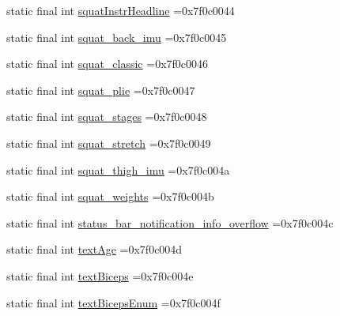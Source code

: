 \begin{DoxyCompactItemize}
\item 
static final int \mbox{\hyperlink{classcom_1_1example_1_1trainawearapplication_1_1_r_1_1string_a59bf3289f3762d505af6917df0dc34f4}{squat\+Instr\+Headline}} =0x7f0c0044
\item 
static final int \mbox{\hyperlink{classcom_1_1example_1_1trainawearapplication_1_1_r_1_1string_a8c166196f61da152cb46e01eda884180}{squat\+\_\+back\+\_\+imu}} =0x7f0c0045
\item 
static final int \mbox{\hyperlink{classcom_1_1example_1_1trainawearapplication_1_1_r_1_1string_a7f7d9e179127bfdaacf0366ca40d3bcb}{squat\+\_\+classic}} =0x7f0c0046
\item 
static final int \mbox{\hyperlink{classcom_1_1example_1_1trainawearapplication_1_1_r_1_1string_a865b8aded5b3d28508c5f29c4279e58a}{squat\+\_\+plie}} =0x7f0c0047
\item 
static final int \mbox{\hyperlink{classcom_1_1example_1_1trainawearapplication_1_1_r_1_1string_a822ae997631a7b320b36b9bd6cceec94}{squat\+\_\+stages}} =0x7f0c0048
\item 
static final int \mbox{\hyperlink{classcom_1_1example_1_1trainawearapplication_1_1_r_1_1string_a0ea5d2f0e343f3b72464963548de72fc}{squat\+\_\+stretch}} =0x7f0c0049
\item 
static final int \mbox{\hyperlink{classcom_1_1example_1_1trainawearapplication_1_1_r_1_1string_a7a87772655c24ce4cf51d49856cfc225}{squat\+\_\+thigh\+\_\+imu}} =0x7f0c004a
\item 
static final int \mbox{\hyperlink{classcom_1_1example_1_1trainawearapplication_1_1_r_1_1string_a7af3452c07fb1e20e4590d4206a62d96}{squat\+\_\+weights}} =0x7f0c004b
\item 
static final int \mbox{\hyperlink{classcom_1_1example_1_1trainawearapplication_1_1_r_1_1string_a90fa5ef886df0f6f049d271e54b16f4e}{status\+\_\+bar\+\_\+notification\+\_\+info\+\_\+overflow}} =0x7f0c004c
\item 
static final int \mbox{\hyperlink{classcom_1_1example_1_1trainawearapplication_1_1_r_1_1string_ab63bc5b8bc7940b853f938f3558d52af}{text\+Age}} =0x7f0c004d
\item 
static final int \mbox{\hyperlink{classcom_1_1example_1_1trainawearapplication_1_1_r_1_1string_a8857cf81014403f86aa6d2f6fca1b209}{text\+Biceps}} =0x7f0c004e
\item 
static final int \mbox{\hyperlink{classcom_1_1example_1_1trainawearapplication_1_1_r_1_1string_a2b91ba6ca1399cb31de56afc1c2105ef}{text\+Biceps\+Enum}} =0x7f0c004f
\item 

\end{DoxyCompactItemize}

